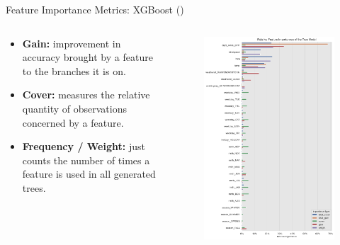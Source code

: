 \documentclass[10pt]{beamer}
\begin{document}
\begin{frame}{Feature Importance Metrics: XGBoost (\cite{xgboost})}

\begin{columns}
\begin{column}{0.4\textwidth}
  \begin{itemize}
  \item {\bf Gain:} improvement in accuracy brought by a feature to the branches it is on.
  \item {\bf Cover:} measures the relative quantity of observations concerned by a feature.
  \item {\bf Frequency / Weight:} just counts the number of times a feature is used in all generated trees.
  \end{itemize}
\end{column}
\begin{column}{0.6\textwidth}
\begin{center}
  \begin{figure}
    \includegraphics[scale=0.25]{images/interpretable_ml_84_0.png}
  \end{figure}
\end{center}
\end{column}
\end{columns}
\end{frame}
\end{document}
